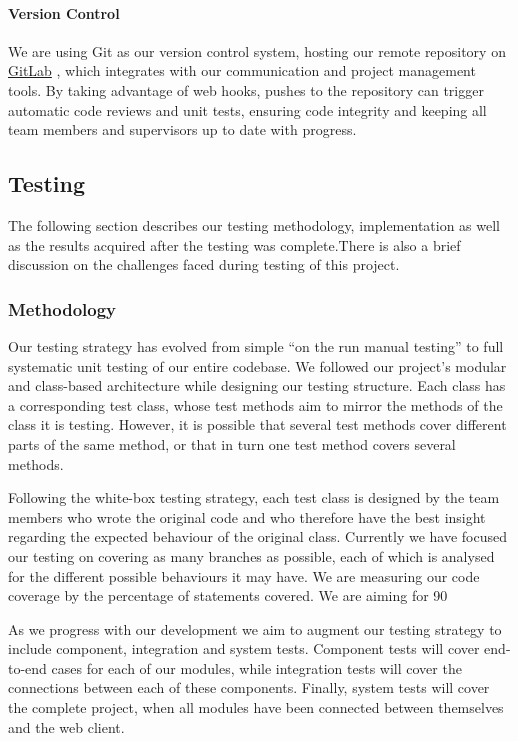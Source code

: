 \documentclass[a4paper,11pt]{article}
\begin{document}
\paragraph{Version Control}
We are using Git as our version control system, hosting our remote repository on \href{http://gitlab.com}{GitLab} \cite{gitlab}, which integrates with our communication and project management tools. By taking advantage of web hooks, pushes to the repository can trigger automatic code reviews and unit tests, ensuring code integrity and keeping all team members and supervisors up to date with progress.

\subsection{Testing}
The following section describes our testing methodology, implementation as well as the results acquired after the testing was complete.There is also a brief discussion on the challenges faced during testing of this project.
\subsubsection{Methodology}
Our testing strategy has evolved from simple ``on the run manual testing'' to full systematic unit testing of our entire codebase. We followed our project's modular and class-based architecture while designing our testing structure. Each class has a corresponding test class, whose test methods aim to mirror the methods of the class it is testing. However, it is possible that several test methods cover different parts of the same method, or that in turn one test method covers several methods.

Following the white-box testing strategy, each test class is designed by the team members who wrote the original code and who therefore have the best insight regarding the expected behaviour of the original class. Currently we have focused our testing on covering as many branches as possible, each of which is analysed for the different possible behaviours it may have. We are measuring our code coverage by the percentage of statements covered. We are aiming for 90%

As we progress with our development we aim to augment our testing strategy to include component, integration and system tests. Component tests will cover end-to-end cases for each of our modules, while integration tests will cover the connections between each of these components. Finally, system tests will cover the complete project, when all modules have been connected between themselves and the web client.
\end{document}
